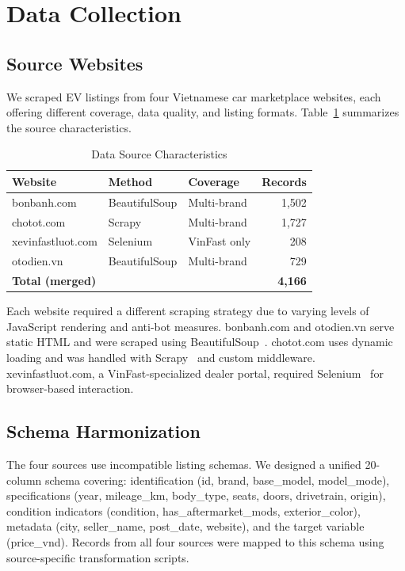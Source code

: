 \documentclass[lettersize,journal]{IEEEtran}
\begin{document}
\section{Data Collection}

\subsection{Source Websites}
We scraped EV listings from four Vietnamese car marketplace websites, each
offering different coverage, data quality, and listing formats. Table~\ref{tab:sources}
summarizes the source characteristics.

\begin{table}[!t]
\caption{Data Source Characteristics\label{tab:sources}}
\centering
\begin{tabular}{lllr}
\toprule
\textbf{Website} & \textbf{Method} & \textbf{Coverage} & \textbf{Records} \\
\midrule
bonbanh.com & BeautifulSoup & Multi-brand & 1,502 \\
chotot.com & Scrapy & Multi-brand & 1,727 \\
xevinfastluot.com & Selenium & VinFast only & 208 \\
otodien.vn & BeautifulSoup & Multi-brand & 729 \\
\midrule
\multicolumn{3}{l}{\textbf{Total (merged)}} & \textbf{4,166} \\
\bottomrule
\end{tabular}
\end{table}

Each website required a different scraping strategy due to varying levels of
JavaScript rendering and anti-bot measures. bonbanh.com and otodien.vn serve
static HTML and were scraped using BeautifulSoup~\cite{bs4}. chotot.com
uses dynamic loading and was handled with Scrapy~\cite{scrapy} and custom
middleware. xevinfastluot.com, a VinFast-specialized dealer portal, required
Selenium~\cite{selenium} for browser-based interaction.

\subsection{Schema Harmonization}
The four sources use incompatible listing schemas. We designed a unified
20-column schema covering: identification (id, brand, base\_model,
model\_mode), specifications (year, mileage\_km, body\_type, seats, doors,
drivetrain, origin), condition indicators (condition, has\_aftermarket\_mods,
exterior\_color), metadata (city, seller\_name, post\_date, website), and the
target variable (price\_vnd). Records from all four sources were mapped to
this schema using source-specific transformation scripts.
\end{document}
